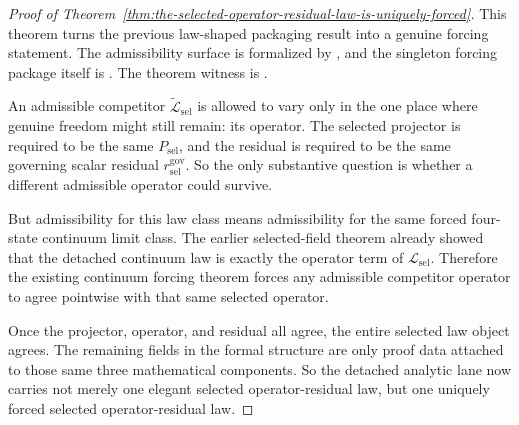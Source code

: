 \begin{proof}[Proof of Theorem~\ref{thm:the-selected-operator-residual-law-is-uniquely-forced}]
\label{proof:thm:the-selected-operator-residual-law-is-uniquely-forced}
This theorem turns the previous law-shaped packaging result into a genuine
forcing statement. The admissibility surface is formalized by
, and the
singleton forcing package itself is
. The theorem witness is
.

An admissible competitor \(\widetilde{\mathcal{L}}_{\mathrm{sel}}\) is allowed
to vary only in the one place where genuine freedom might still remain: its
operator. The selected projector is required to be the same
\(P_{\mathrm{sel}}\), and the residual is required to be the same governing
scalar residual \(r^{\mathrm{gov}}_{\mathrm{sel}}\). So the only substantive
question is whether a different admissible operator could survive.

But admissibility for this law class means admissibility for the same forced
four-state continuum limit class. The earlier selected-field theorem already
showed that the detached continuum law is exactly the operator term of
\(\mathcal{L}_{\mathrm{sel}}\). Therefore the existing continuum forcing
theorem forces any admissible competitor operator to agree pointwise with that
same selected operator.

Once the projector, operator, and residual all agree, the entire selected law
object agrees. The remaining fields in the formal structure are only proof
data attached to those same three mathematical components. So the detached
analytic lane now carries not merely one elegant selected operator-residual
law, but one uniquely forced selected operator-residual law.
\end{proof}

